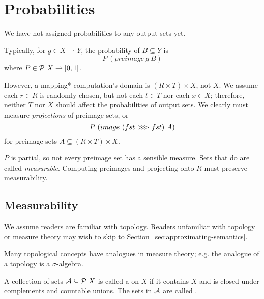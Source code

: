 \documentclass[preprint]{sigplanconf}
\newcommand{\pto}{\rightharpoonup}
\newcommand{\arrowcomp}{\ensuremath{{>}\mspace{-6mu}{>}\mspace{-6mu}{>}}}
\begin{document}

\section{Probabilities}
\label{sec:measurability}

We have not assigned probabilities to any output sets yet.

Typically, for $g \in X \pto Y$, the probability of $B \subseteq Y$ is
\begin{equation}
	P~(preimage~g~B)
\end{equation}
where $P \in \powerset~X \pto [0,1]$.

However, a mapping* computation's domain is $(R \times T) \times X$, not $X$.
We assume each $r \in R$ is randomly chosen, but not each $t \in T$ nor each $x \in X$; therefore, neither $T$ nor $X$ should affect the probabilities of output sets.
We clearly must measure \emph{projections} of preimage sets, or
\begin{equation}
	P~(image~(fst~\arrowcomp~fst)~A)
\end{equation}
for preimage sets $A \subseteq (R \times T) \times X$. 

$P$ is partial, so not every preimage set has a sensible measure.
Sets that do are called \emph{measurable}.
Computing preimages and projecting onto $R$ must preserve measurability.

\subsection{Measurability}

We assume readers are familiar with topology.
Readers unfamiliar with topology or measure theory may wish to skip to Section~\ref{sec:approximating-semantics}.

Many topological concepts have analogues in measure theory; e.g. the analogue of a topology is a $\sigma$-algebra.

\begin{definition}
A collection of sets $\mathcal{A} \subseteq \mathcal{P}~X$ is called a  on $X$ if it contains $X$ and is closed under complements and countable unions.
The sets in $\mathcal{A}$ are called .
\end{definition}
\end{document}
